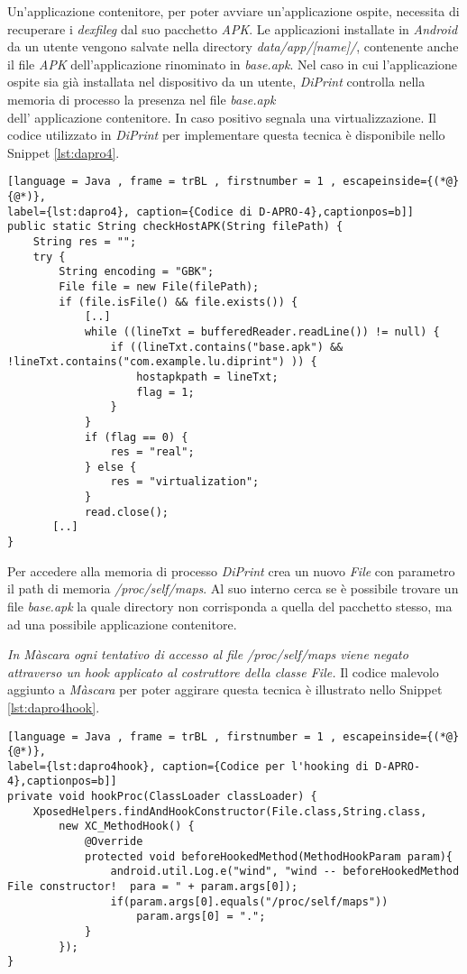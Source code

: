 Un'applicazione contenitore, per poter avviare un'applicazione ospite, necessita di recuperare i \emph{\gls{dexfileg}} dal suo pacchetto \emph{APK}. Le applicazioni installate in \emph{Android} da un utente vengono salvate nella directory \emph{data/app/[name]/}, contenente anche il file \emph{APK} dell'applicazione rinominato in \emph{base.apk}.
Nel caso in cui l'applicazione ospite sia già installata nel dispositivo da un utente, \emph{DiPrint} controlla nella memoria di processo la presenza nel file \emph{base.apk} \\dell' applicazione contenitore.
In caso positivo segnala una virtualizzazione. Il codice utilizzato in \emph{DiPrint} per implementare questa tecnica è disponibile nello Snippet \ref{lst:dapro4}.

\begin{lstlisting}[language = Java , frame = trBL , firstnumber = 1 , escapeinside={(*@}{@*)},
label={lst:dapro4}, caption={Codice di D-APRO-4},captionpos=b]]
public static String checkHostAPK(String filePath) {
    String res = "";
    try {
        String encoding = "GBK";
        File file = new File(filePath);
        if (file.isFile() && file.exists()) {
            [..]
            while ((lineTxt = bufferedReader.readLine()) != null) {
                if ((lineTxt.contains("base.apk") && !lineTxt.contains("com.example.lu.diprint") )) {
                    hostapkpath = lineTxt;
                    flag = 1;
                }
            }
            if (flag == 0) {
                res = "real";
            } else {
                res = "virtualization";
            }
            read.close();
       [..]
}

\end{lstlisting}

Per accedere alla memoria di processo \emph{DiPrint} crea un nuovo \emph{File} con parametro il path di memoria \emph{/proc/self/maps}.
Al suo interno cerca se è possibile trovare un file \emph{base.apk} la quale directory non corrisponda a quella del pacchetto stesso, ma ad una possibile applicazione contenitore.

\emph{In Màscara ogni tentativo di accesso al file /proc/self/maps viene negato attraverso un hook applicato al costruttore della classe File.} Il codice malevolo aggiunto a \emph{Màscara} per poter aggirare questa tecnica è illustrato nello Snippet \ref{lst:dapro4hook}.

\begin{lstlisting}[language = Java , frame = trBL , firstnumber = 1 , escapeinside={(*@}{@*)},
label={lst:dapro4hook}, caption={Codice per l'hooking di D-APRO-4},captionpos=b]]
private void hookProc(ClassLoader classLoader) {
    XposedHelpers.findAndHookConstructor(File.class,String.class,
        new XC_MethodHook() {
            @Override
            protected void beforeHookedMethod(MethodHookParam param){
                android.util.Log.e("wind", "wind -- beforeHookedMethod File constructor!  para = " + param.args[0]);
                if(param.args[0].equals("/proc/self/maps"))
                    param.args[0] = ".";
            }
        });
}
\end{lstlisting}

